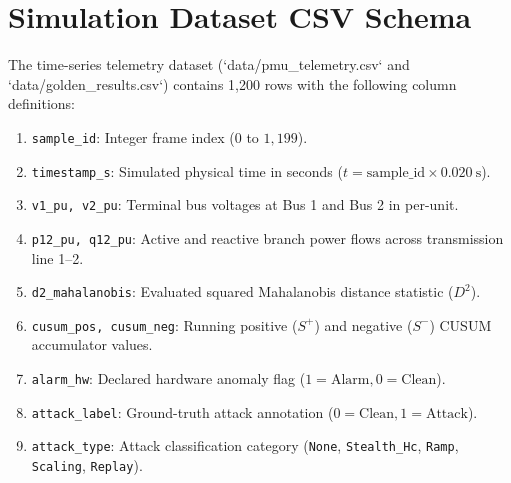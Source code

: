 \documentclass[12pt,a4paper]{report}
\begin{document}
\chapter{Simulation Dataset CSV Schema}
The time-series telemetry dataset (`data/pmu_telemetry.csv` and `data/golden_results.csv`)
contains 1,200 rows with the following column definitions:
\begin{enumerate}
    \item \texttt{sample\_id}: Integer frame index ($0$ to $1,199$).
    \item \texttt{timestamp\_s}: Simulated physical time in seconds ($t = \text{sample\_id} \times 0.020~\text{s}$).
    \item \texttt{v1\_pu, v2\_pu}: Terminal bus voltages at Bus 1 and Bus 2 in per-unit.
    \item \texttt{p12\_pu, q12\_pu}: Active and reactive branch power flows across transmission line 1--2.
    \item \texttt{d2\_mahalanobis}: Evaluated squared Mahalanobis distance statistic ($D^2$).
    \item \texttt{cusum\_pos, cusum\_neg}: Running positive ($S^+$) and negative ($S^-$) CUSUM accumulator values.
    \item \texttt{alarm\_hw}: Declared hardware anomaly flag ($1 = \text{Alarm}, 0 = \text{Clean}$).
    \item \texttt{attack\_label}: Ground-truth attack annotation ($0 = \text{Clean}, 1 = \text{Attack}$).
    \item \texttt{attack\_type}: Attack classification category (\texttt{None}, \texttt{Stealth\_Hc}, \texttt{Ramp}, \texttt{Scaling}, \texttt{Replay}).
\end{enumerate}
\end{document}
